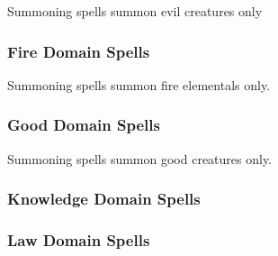 \begin{spelllist}
    \SLbane[1]
    \SLprotectionfromalignment[2]
    \SLsummonmonsteriii[3]
    \SLunholyblight[3]
    \SLenervation[4]
    \SLbanemass[5]
    \SLblasphemy[6]
    \SLdeathknell[6]
    \SLharm[6]
    \SLsummonmonstervi[6]
    \SLenervationgreater[8]
    \SLunholyaura[8]
    \SLassimilate[9]
    \SLsummonmonsterix[9]
\end{spelllist}
Summoning spells summon evil creatures only

\subsubsection{Fire Domain Spells}

\begin{spelllist}
    \SLburninghands[1]
    \SLflameblade[2]
    \SLscorchingray[2]
    \SLwalloffire[2]
    \SLfireball[3]
    \SLfireshield[3]
    \SLsummonmonsterv[4]
    \SLfireseeds[5]
    \SLflamestrike[5]
    \SLwalloffiregreater[5]
    \SLdelayedblastfireball[7]
    \SLsummonmonsterviii[7]
    \SLfirestorm[8]
    \SLmeteorswarm[9]
\end{spelllist}
Summoning spells summon fire elementals only.

\subsubsection{Good Domain Spells}

\begin{spelllist}
    \SLbless[1]
    \SLprotectionfromalignment[2]
    \SLdeathward[3]
    \SLsummonmonsteriii[3]
    \SLholysmite[3]
    \SLblessmass[4]
    \SLheal[6]
    \SLholyword[6]
    \SLdivinemight[6]
    \SLsummonmonstervi[6]
    \SLholyaura[8]
    \SLsummonmonsterix[9]
\end{spelllist}
Summoning spells summon good creatures only.

\subsubsection{Knowledge Domain Spells}

\begin{spelllist}
    \SLreadmind[2]
    \SLforesight[3]
    \SLmomentofprescience[4]
    \SLreadmindgreater[6]
    \SLtrueseeing[7]
    \SLmomentofpresciencegreater[8]
    \SLreadmindmass[8]
    \SLrevelation[9]
\end{spelllist}

\subsubsection{Law Domain Spells}

